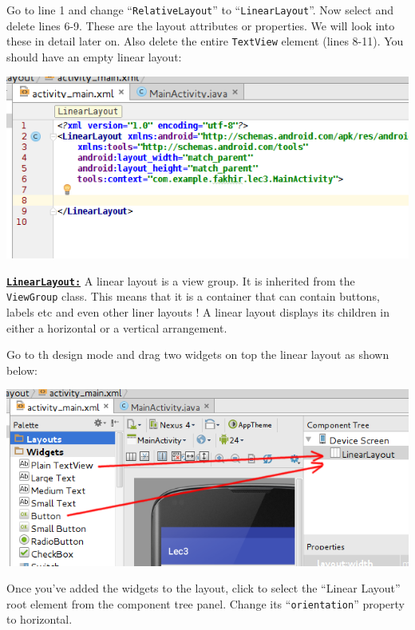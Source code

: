 Go to line 1 and change ``\texttt{RelativeLayout}'' to ``\texttt{LinearLayout}''. Now select and delete lines 6-9. These are the layout attributes or properties. We will look into these in detail later on. Also delete the entire \texttt{TextView} element (lines 8-11). You should have an empty linear layout:

\begin{center}
	\includegraphics[scale=0.4]{chapters/ch03/images/4_linear_layout}
\end{center} 

\underline{\textbf{\texttt{LinearLayout:}}} A linear layout is a view group. It is inherited from the \texttt{ViewGroup} class. This means that it is a container that can contain buttons, labels etc and even other liner layouts ! A linear layout displays its children in either a horizontal or a vertical arrangement.

Go to th design mode and drag two widgets on top the linear layout as shown below:

\begin{center}
	\includegraphics[scale=0.4]{chapters/ch03/images/5_linear_layout}
\end{center} 

Once you've added the widgets to the layout, click to select the ``Linear Layout'' root element from the component tree panel. Change its ``\texttt{orientation}'' property to horizontal. 

